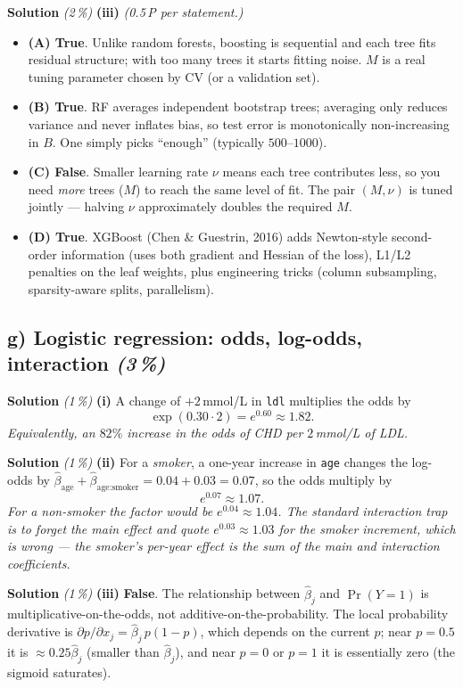 \documentclass[11pt,a4paper]{article}
\newcommand{\subpoints}[1]{\textit{(#1\,\%)}}
\newcommand{\sol}{\noindent\textbf{Solution}}
\begin{document}
\medskip
\sol{} \subpoints{2} \textbf{(iii)} \emph{(0.5\,P per statement.)}
\begin{itemize}
  \item \textbf{(A) True}. Unlike random forests, boosting is sequential and each tree fits
        residual structure; with too many trees it starts fitting noise. $M$ is a real tuning
        parameter chosen by CV (or a validation set).
  \item \textbf{(B) True}. RF averages independent bootstrap trees; averaging only reduces
        variance and never inflates bias, so test error is monotonically non-increasing in $B$.
        One simply picks ``enough'' (typically $500$--$1000$).
  \item \textbf{(C) False}. Smaller learning rate $\nu$ means each tree contributes less, so you
        need \emph{more} trees ($M$) to reach the same level of fit. The pair $(M,\nu)$ is tuned
        jointly --- halving $\nu$ approximately doubles the required $M$.
  \item \textbf{(D) True}. XGBoost (Chen \& Guestrin, 2016) adds Newton-style second-order
        information (uses both gradient and Hessian of the loss), L1/L2 penalties on the leaf
        weights, plus engineering tricks (column subsampling, sparsity-aware splits, parallelism).
\end{itemize}

\subsection*{g) Logistic regression: odds, log-odds, interaction \subpoints{3}}

\sol{} \subpoints{1} \textbf{(i)} A change of $+2$\,mmol/L in \texttt{ldl} multiplies the odds by
$$\exp(0.30\cdot 2) = e^{0.60} \approx \boxed{1.82}.$$
\emph{Equivalently, an $82\%$ increase in the odds of CHD per $2$\,mmol/L of LDL.}

\medskip
\sol{} \subpoints{1} \textbf{(ii)} For a \emph{smoker}, a one-year increase in \texttt{age} changes
the log-odds by $\hat\beta_{\text{age}} + \hat\beta_{\text{age:smoker}} = 0.04 + 0.03 = 0.07$, so
the odds multiply by
$$e^{0.07} \approx \boxed{1.07}.$$
\emph{For a non-smoker the factor would be $e^{0.04}\approx 1.04$. The standard interaction trap is
to forget the main effect and quote $e^{0.03}\approx 1.03$ for the smoker increment, which is
wrong --- the smoker's per-year effect is the \emph{sum} of the main and interaction coefficients.}

\medskip
\sol{} \subpoints{1} \textbf{(iii)} \textbf{False}. The relationship between $\hat\beta_j$ and
$\Pr(Y=1)$ is multiplicative-on-the-odds, not additive-on-the-probability. The local probability
derivative is $\partial p/\partial x_j = \hat\beta_j\, p(1-p)$, which depends on the current
$p$; near $p = 0.5$ it is $\approx 0.25\hat\beta_j$ (smaller than $\hat\beta_j$), and near $p=0$ or
$p=1$ it is essentially zero (the sigmoid saturates).
\end{document}
